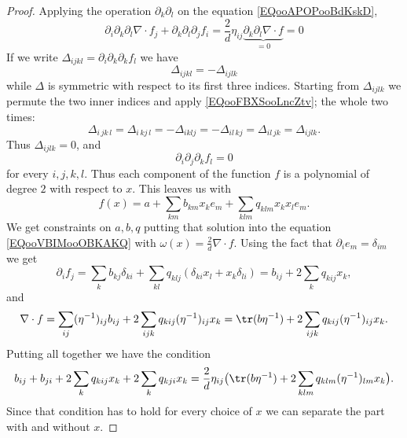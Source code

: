 \begin{proof}
    Applying the operation \( \partial_k\partial_l\) on the equation \eqref{EQooAPOPooBdKskD},
    \begin{equation}
        \partial_i\partial_k\partial_l\nabla\cdot f_j+\partial_k\partial_l\partial_j f_i=\frac{ 2 }{ d }\eta_{ij}\underbrace{\partial_k\partial_l\nabla\cdot f}_{=0}=0
    \end{equation}
    If we write \( \Delta_{ijkl}=\partial_i\partial_k\partial_k f_l\) we have
    \begin{equation}    \label{EQooFBXSooLncZtv}
        \Delta_{ijkl}=-\Delta_{ijlk}
    \end{equation}
    while \( \Delta\) is symmetric with respect to its first three indices. Starting from \( \Delta_{ijlk}\) we permute the two inner indices and apply \eqref{EQooFBXSooLncZtv}; the whole two times:
    \begin{equation}
        \Delta_{i\,jk\,l}=\Delta_{i\,kj\,l}=-\Delta_{iklj}=-\Delta_{il\,kj}=\Delta_{il\,jk}=\Delta_{ijlk}.
    \end{equation}
    Thus \( \Delta_{ijlk}=0\), and
    \begin{equation}
        \partial_i\partial_j\partial_kf_l=0
    \end{equation}
    for every \( i,j,k,l\). Thus each component of the function \( f\) is a polynomial of degree \( 2\) with respect to \( x\). This leaves us with
    \begin{equation}
        f(x)=a+\sum_{km}b_{km}x_ke_m+\sum_{klm}q_{klm}x_kx_le_m.
    \end{equation}
    We get constraints on \( a,b,q\) putting that solution into the equation \eqref{EQooVBIMooOBKAKQ} with \( \omega(x)=\frac{ 2 }{ d }\nabla\cdot f\). Using the fact that \( \partial_ie_m=\delta_{im}\) we get
    \begin{equation}
        \partial_if_j=\sum_kb_{kj}\delta_{ki}+\sum_{kl}q_{klj}(\delta_{ki}x_l+x_k\delta_{li})=b_{ij}+2\sum_kq_{kij}x_k,
    \end{equation}
    and
    \begin{equation}
        \nabla\cdot f=\sum_{ij}(\eta^{-1})_{ij}b_{ij}+2\sum_{ijk}q_{kij}(\eta^{-1})_{ij}x_k=\tr(b\eta^{-1})+2\sum_{ijk}q_{kij}(\eta^{-1})_{ij}x_k.
    \end{equation}
    Putting all together we have the condition
    \begin{equation}
        b_{ij}+b_{ji}+2\sum_{k}q_{kij}x_k+2\sum_kq_{kji}x_k=\frac{ 2 }{ d }\eta_{ij}\big( \tr(b\eta^{-1})+2\sum_{klm}q_{klm}(\eta^{-1})_{lm}x_k \big).
    \end{equation}
    Since that condition has to hold for every choice of \( x\) we can separate the part with and without \( x\).


\end{proof}
